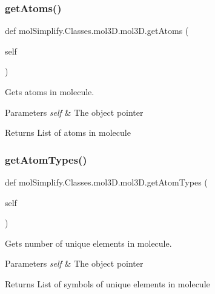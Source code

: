 \subsubsection{\texorpdfstring{get\+Atoms()}{getAtoms()}}
{\footnotesize\ttfamily def mol\+Simplify.\+Classes.\+mol3\+D.\+mol3\+D.\+get\+Atoms (\begin{DoxyParamCaption}\item[{}]{self }\end{DoxyParamCaption})}



Gets atoms in molecule. 


\begin{DoxyParams}{Parameters}
{\em self} & The object pointer \\
\hline
\end{DoxyParams}
\begin{DoxyReturn}{Returns}
List of atoms in molecule 
\end{DoxyReturn}
\mbox{\label{classmolSimplify_1_1Classes_1_1mol3D_1_1mol3D_a53c044279fd5d0dace4f220c950921fa}} 
\subsubsection{\texorpdfstring{get\+Atom\+Types()}{getAtomTypes()}}
{\footnotesize\ttfamily def mol\+Simplify.\+Classes.\+mol3\+D.\+mol3\+D.\+get\+Atom\+Types (\begin{DoxyParamCaption}\item[{}]{self }\end{DoxyParamCaption})}



Gets number of unique elements in molecule. 


\begin{DoxyParams}{Parameters}
{\em self} & The object pointer \\
\hline
\end{DoxyParams}
\begin{DoxyReturn}{Returns}
List of symbols of unique elements in molecule 
\end{DoxyReturn}
\mbox{\label{classmolSimplify_1_1Classes_1_1mol3D_1_1mol3D_a394c680ec3eddbcc22ebcec76d211218}} 
